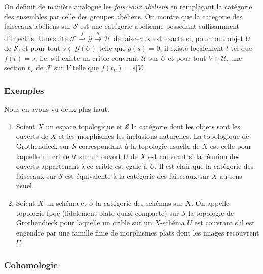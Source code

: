 \documentclass{article}
\newcommand{\cF}{\mathcal{F}}
\newcommand{\cG}{\mathcal{G}}
\newcommand{\cH}{\mathcal{H}}
\newcommand{\cS}{\mathcal{S}}
\newcommand{\cU}{\mathcal{U}}
\begin{document}
On définit de manière analogue les \emph{faisceaux abéliens} en 
remplaçant la catégorie des ensembles par celle des groupes abéliens. On 
montre que la catégorie des faisceaux abéliens sur $\cS$ est une 
catégorie abélienne possédant suffisamment d'injectifs. Une suite 
$\cF\xrightarrow f \cG\xrightarrow g \cH$ de faisceaux est exacte si, pour 
tout objet $U$ de $\cS$, et pour tout $s\in \cG(U)$ telle que $g(s)=0$, 
il existe localement $t$ tel que $f(t)=s$; i.e. s'il existe un crible couvrant 
$\cU$ sur $U$ et pour tout $V\in\cU$, une section $t_V$ de $\cF$ sur $V$ telle 
que $f(t_V)=s|V$. 





\subsubsection{Exemples}\label{1-6-4}

Nous en avons vu deux plus haut. 

\begin{enumerate}[\indent a)]
  \item Soient $X$ un espace topologique et $\cS$ la catégorie dont les objets 
    sont les ouverts de $X$ et les morphismes les inclusions naturelles. La 
    topologique de Grothendieck sur $\cS$ correspondant à la topologie usuelle 
    de $X$ est celle pour laquelle un crible $\cU$ sur un ouvert $U$ de $X$ est 
    couvrant si la réunion des ouverts appartenant à ce crible est égale à 
    $U$. Il est clair que la catégorie des faisceaux sur $\cS$ est équivalente 
    à la catégorie des faisceaux sur $X$ au sens usuel. 
  \item Soient $X$ un schéma et $\cS$ la catégorie des schémas sur $X$. On 
    appelle topologie fpqc (fidèlement plate quasi-compacte) sur $\cS$ la 
    topologie de Grothendieck pour laquelle un crible sur un $X$-schéma $U$ est 
    couvrant s'il est engendré par une famille finie de morphismes plats dont  
    les images recouvrent $U$. 
\end{enumerate}





\subsubsection{Cohomologie}\label{1-6-5}
\end{document}
